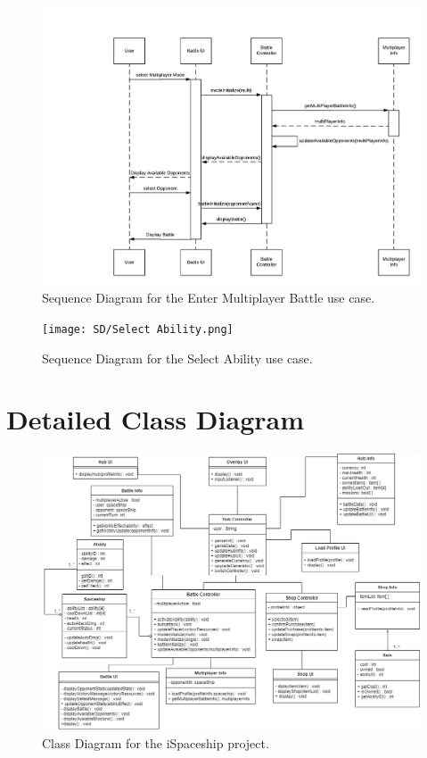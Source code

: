 \documentclass[]{article}
\begin{document}
\begin{figure}[H]
    \centering
    \includegraphics[width=\textwidth]{SD/Enter Multiplayer Player Battle.png}
    \caption{Sequence Diagram for the Enter Multiplayer Battle use case.}
    \label{fig:sd}
\end{figure}

\begin{figure}[H]
    \centering
    \texttt{[image: SD/Select Ability.png]}
    \caption{Sequence Diagram for the Select Ability use case.}
    \label{fig:sd}
\end{figure}



\section{Detailed Class Diagram}
\label{sec:detailed_class_diagram}
\begin{figure}[H]
    \centering
    \includegraphics[width=\textwidth]{ClassDiagram.png}
    \caption{Class Diagram for the iSpaceship project.}
    \label{fig:ca}
\end{figure}
\end{document}
